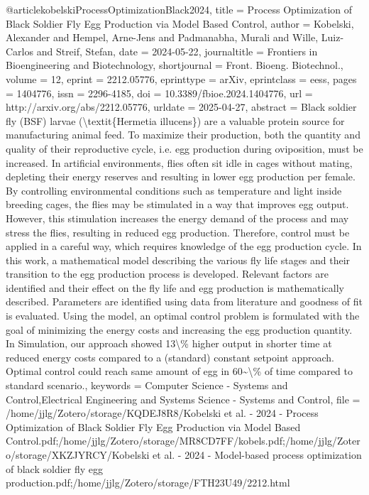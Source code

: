 {{{{@article{kobelskiProcessOptimizationBlack2024,
  title = {Process {{Optimization}} of {{Black Soldier Fly Egg Production}} via {{Model Based Control}}},
  author = {Kobelski, Alexander and Hempel, Arne-Jens and Padmanabha, Murali and Wille, Luiz-Carlos and Streif, Stefan},
  date = {2024-05-22},
  journaltitle = {Frontiers in Bioengineering and Biotechnology},
  shortjournal = {Front. Bioeng. Biotechnol.},
  volume = {12},
  eprint = {2212.05776},
  eprinttype = {arXiv},
  eprintclass = {eess},
  pages = {1404776},
  issn = {2296-4185},
  doi = {10.3389/fbioe.2024.1404776},
  url = {http://arxiv.org/abs/2212.05776},
  urldate = {2025-04-27},
  abstract = {Black soldier fly (BSF) larvae (\textbackslash textit\{Hermetia illucens\}) are a valuable protein source for manufacturing animal feed. To maximize their production, both the quantity and quality of their reproductive cycle, i.e. egg production during oviposition, must be increased. In artificial environments, flies often sit idle in cages without mating, depleting their energy reserves and resulting in lower egg production per female. By controlling environmental conditions such as temperature and light inside breeding cages, the flies may be stimulated in a way that improves egg output. However, this stimulation increases the energy demand of the process and may stress the flies, resulting in reduced egg production. Therefore, control must be applied in a careful way, which requires knowledge of the egg production cycle. In this work, a mathematical model describing the various fly life stages and their transition to the egg production process is developed. Relevant factors are identified and their effect on the fly life and egg production is mathematically described. Parameters are identified using data from literature and goodness of fit is evaluated. Using the model, an optimal control problem is formulated with the goal of minimizing the energy costs and increasing the egg production quantity. In Simulation, our approach showed 13\textbackslash\% higher output in shorter time at reduced energy costs compared to a (standard) constant setpoint approach. Optimal control could reach same amount of egg in 60\textasciitilde\textbackslash\% of time compared to standard scenario.},
  keywords = {Computer Science - Systems and Control,Electrical Engineering and Systems Science - Systems and Control},
  file = {/home/jjlg/Zotero/storage/KQDEJ8R8/Kobelski et al. - 2024 - Process Optimization of Black Soldier Fly Egg Production via Model Based Control.pdf;/home/jjlg/Zotero/storage/MR8CD7FF/kobels.pdf;/home/jjlg/Zotero/storage/XKZJYRCY/Kobelski et al. - 2024 - Model-based process optimization of black soldier fly egg production.pdf;/home/jjlg/Zotero/storage/FTH23U49/2212.html}
}

}}}}
